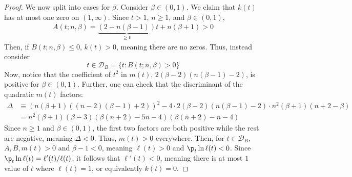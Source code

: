 \documentclass[11pt]{article}
\begin{document}
\begin{proof}

We now split into cases for $\beta$. Consider $\beta\in (0,1)$. We claim that $k(t)$ has at most one zero on $(1,\infty)$. Since $t>1$, $n\geq 1$, and $\beta \in (0,1)$, 
\begin{align*}
   A(t;n,\beta)=\underbrace{(2-n(\beta-1))}_{\geq 0}t+n(\beta+1)>0 
\end{align*}
Then, if $B(t;n,\beta)\leq 0$, $k(t)>0$, meaning there are no zeros. Thus, instead consider 
$$t\in \mathcal{D}_B=\{t:B(t;n,\beta)>0\}$$
Now, notice that the coefficient of $t^2$ in $m(t)$, $2(\beta-2)(n(\beta-1)-2)$, is positive for $\beta\in (0,1)$. Further, one can check that the discriminant of the quadratic $m(t)$ factors:
\begin{align*}
    \Delta&\equiv (n(\beta+1)((n-2)(\beta-1)+2))^2-4\cdot 2(\beta-2)(n(\beta-1)-2)\cdot n^2(\beta+1)(n+2-\beta)\\
    &=n^2(\beta+1)(\beta-3)(\beta(n+2)-5n-4)(\beta(n+2)-n-4)
\end{align*}
Since $n\geq 1$ and $\beta \in (0,1)$, the first two factors are both positive while the rest are negative, meaning $\Delta < 0$. Thus, $m(t)>0$ everywhere. Then, for $t\in \mathcal{D}_B$, $A,B,m(t)>0$ and $\beta-1<0$, meaning $\ell(t)>0$ and $\p_t\ln \ell(t)<0$. Since $\p_t \ln \ell(t)=\ell'(t)/\ell(t)$, it follows that $\ell'(t)<0$, meaning there is at most $1$ value of $t$ where $\ell(t)=1$, or equivalently $k(t)=0$. 


\end{proof}
\end{document}
